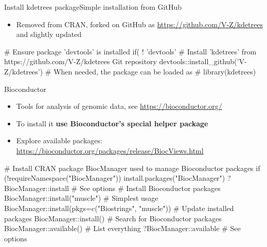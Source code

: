 \documentclass[compress, xelatex, 11pt, xcolor=svgnames, aspectratio=169,
	hyperref={
		bookmarks=true,
		unicode=true,
		colorlinks=true,
		pdftitle={Molecular data in R},
		plainpages=false,
		pdfauthor={Vojtech Zeisek},
		pdfsubject={Course about phylogeny and evolution in R},
		pdfcreator={XeLaTeX},
		pdfkeywords={R, evolution, phylogeny, molecular data},
		linkcolor=Crimson, %
		anchorcolor=Magenta, %
		citecolor=Magenta, %
		filecolor=Magenta, %
		menucolor=Magenta, %
		urlcolor=DodgerBlue, %
		},
	url={hyphens, lowtilde} %
	]{beamer}
\begin{document}
\begin{frame}[fragile]{Install kdetrees package}{Simple installation from GitHub}
	\label{kdetrees}
	\begin{itemize}
		\item Removed from CRAN, forked on GitHub as \url{https://github.com/V-Z/kdetrees} and slightly updated
	\end{itemize}
	\begin{spluscode}
    # Ensure package 'devtools' is installed
    if( ! 'devtools' %
    # Install 'kdetrees' from https://github.com/V-Z/kdetrees Git repository
    devtools::install_github('V-Z/kdetrees')
    # When needed, the package can be loaded as
    # library(kdetrees)
	\end{spluscode}
\end{frame}

\begin{frame}[fragile]{Bioconductor}
	\label{bioc}
	\begin{itemize}
		\item Tools for analysis of genomic data, see \url{https://bioconductor.org/}
		\item To install it \textbf{use Bioconductor's special helper package}
		\item Explore available packages: \href{https://bioconductor.org/packages/}{https://bioconductor.org/packages/release/BiocViews.html}
	\end{itemize}
	\begin{spluscode}
    # Install CRAN package BiocManager used to manage Bioconductor packages
    if (!requireNamespace("BiocManager")) install.packages("BiocManager")
    ?BiocManager::install # See options
    # Install Bioconductor packages
    BiocManager::install("muscle") # Simplest usage
    BiocManager::install(pkgs=c("Biostrings", "muscle"))
    # Update installed packages
    BiocManager::install()
    # Search for Bioconductor packages
    BiocManager::available() # List everything
    ?BiocManager::available # See options
	\end{spluscode}
\end{frame}
\end{document}
